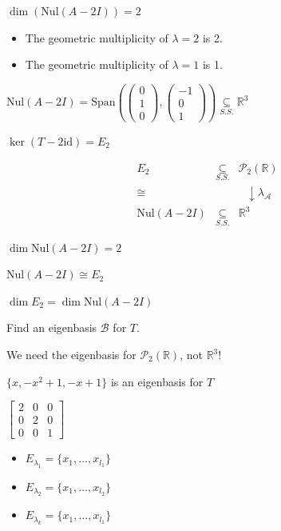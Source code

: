 \documentclass[11pt,fleqn]{book} %
\begin{document}
$\dim(\mathrm{Nul}(A - 2I)) = 2$

\begin{itemize}
    \item The geometric multiplicity of $\lambda = 2$  is 2.
    \item The geometric multiplicity of $\lambda = 1$ is 1.
\end{itemize}

$\mathrm{Nul}(A - 2I) = \mathrm{Span}\left(\begin{pmatrix} 0 \\ 1 \\ 0 \end{pmatrix}, \begin{pmatrix} -1 \\ 0 \\ 1 \end{pmatrix}\right) \underset{S.S.}{\subseteq} \mathbb{R}^3$

$\ker(T - 2\mathrm{id}) = E_2$

$$\begin{matrix} E_2 &\underset{S.S.}\subseteq &\mathcal{P}_2(\mathbb{R}) \\ \cong & &~~~\downarrow \lambda_\mathcal{A} \\ \mathrm{Nul}(A - 2I) &\underset{S.S.}{\subseteq} &\mathbb{R}^3 \end{matrix}$$

$\dim \mathrm{Nul}(A - 2I) = 2$

$\mathrm{Nul}(A - 2I) \cong E_2$

$\dim E_2 = \dim \mathrm{Nul}(A - 2I)$

Find an eigenbasis $\mathcal{B}$ for $T$.

 We need the eigenbasis for $\mathcal{P_2}(\mathbb{R})$, not $\mathbb{R}^3$!

$\{ x, -x^2+1, -x+1 \}$ is an eigenbasis for $T$


$\begin{bmatrix} 2 &0 &0 \\ 0 &2 &0 \\ 0 &0 &1 \end{bmatrix}$

\begin{itemize}
    \item $E_{\lambda_1} = \{ x_1, \dots, x_{l_1} \}$
    \item $E_{\lambda_2} = \{ x_1, \dots, x_{l_2} \}$
    \item $E_{\lambda_k} = \{ x_1, \dots, x_{l_1} \}$
\end{itemize}
\end{document}
